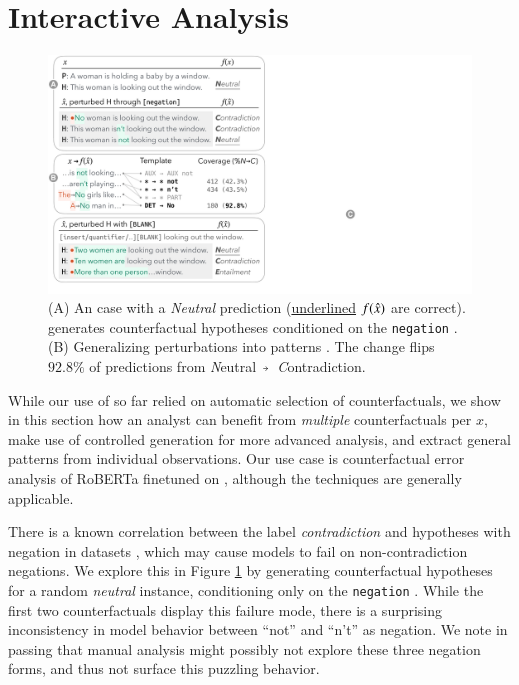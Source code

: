 \section{Interactive Analysis}
\label{sec:app_err_analysis}

%
\begin{figure}[t]
\centering
\includegraphics[trim={0 12.5cm 33cm 0cm},clip,width=1\columnwidth]{figures/err_analysis.pdf}
\vspace{-15pt}
\caption{
(A) An \nli case with a \emph{Neutral} prediction (\uline{underlined} $f(\hat{x})$ are correct).
\sysname generates counterfactual hypotheses conditioned on the \texttt{negation} \tagstr. 
(B) Generalizing perturbations into patterns \cite{wu2020tempura}. The change  flips $92.8\%$ of predictions from \emph{N}eutral~$\veryshortarrow$~\emph{C}ontradiction.
}
\vspace{-5pt}
\label{fig:err_analysis}
\end{figure}
While our use of \sysname so far relied on automatic selection of counterfactuals, we show in this section how an analyst can benefit from \emph{multiple} counterfactuals per $x$, make use of controlled generation for more advanced analysis, and extract general patterns from individual observations.
Our use case is counterfactual error analysis \cite{wu2019errudite} of RoBERTa finetuned on \nli, although the techniques are generally applicable.

There is a known correlation between the label \emph{contradiction} and hypotheses with negation in \nli datasets \cite{gururangan2018annotation}, which may cause models to fail on non-contradiction negations.
We explore this in Figure \ref{fig:err_analysis} by generating counterfactual hypotheses for a random \emph{neutral} instance, conditioning only on the \texttt{negation} \tagstr.
While the first two counterfactuals display this failure mode, there is a surprising inconsistency in model behavior between ``not'' and ``n't'' as negation.
We note in passing that manual analysis might possibly not explore these three negation forms, and thus not surface this puzzling behavior.

